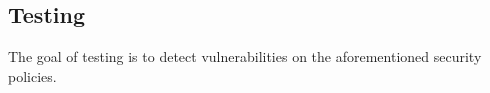 %
%
%

\subsection{Testing}
\label{subsec: testing}
The goal of testing is to detect vulnerabilities on the aforementioned security policies.

